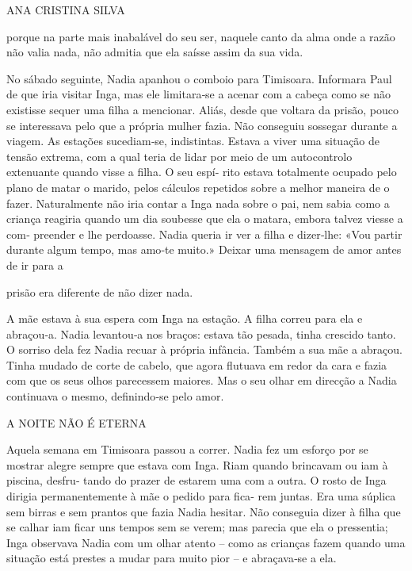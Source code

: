 ANA CRISTINA SILVA

porque na parte mais inabalável do seu ser, naquele canto da alma onde a
razão não valia nada, não admitia que ela saísse assim da sua vida.

No sábado seguinte, Nadia apanhou o comboio para Timisoara. Informara
Paul de que iria visitar Inga, mas ele limitara‑se a acenar com a cabeça
como se não existisse sequer uma filha a mencionar. Aliás, desde que
voltara da prisão, pouco se interessava pelo que a própria mulher fazia.
Não conseguiu sossegar durante a viagem. As estações sucediam‑se,
indistintas. Estava a viver uma situação de tensão extrema, com a qual
teria de lidar por meio de um autocontrolo extenuante quando visse a
filha. O seu espí‑ rito estava totalmente ocupado pelo plano de matar o
marido, pelos cálculos repetidos sobre a melhor maneira de o fazer.
Naturalmente não iria contar a Inga nada sobre o pai, nem sabia como a
criança reagiria quando um dia soubesse que ela o matara, embora talvez
viesse a com‑ preender e lhe perdoasse. Nadia queria ir ver a filha e
dizer‑lhe: «Vou partir durante algum tempo, mas amo‑te muito.» Deixar
uma mensagem de amor antes de ir para a

prisão era diferente de não dizer nada.

A mãe estava à sua espera com Inga na estação. A filha correu para ela e
abraçou‑a. Nadia levantou‑a nos braços: estava tão pesada, tinha
crescido tanto. O sorriso dela fez Nadia recuar à própria infância.
Também a sua mãe a abraçou. Tinha mudado de corte de cabelo, que agora
flutuava em redor da cara e fazia com que os seus olhos parecessem
maiores. Mas o seu olhar em direcção a Nadia continuava o mesmo,
definindo‑se pelo amor.

A NOITE NÃO É ETERNA

Aquela semana em Timisoara passou a correr. Nadia fez um esforço por se
mostrar alegre sempre que estava com Inga. Riam quando brincavam ou iam
à piscina, desfru‑ tando do prazer de estarem uma com a outra. O rosto
de Inga dirigia permanentemente à mãe o pedido para fica‑ rem juntas.
Era uma súplica sem birras e sem prantos que fazia Nadia hesitar. Não
conseguia dizer à filha que se calhar iam ficar uns tempos sem se verem;
mas parecia que ela o pressentia; Inga observava Nadia com um olhar
atento -- como as crianças fazem quando uma situação está prestes a
mudar para muito pior -- e abraçava‑se a ela.

